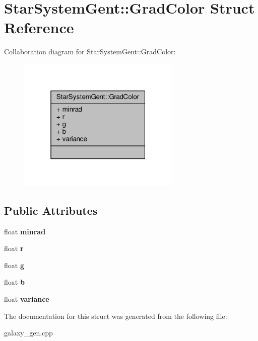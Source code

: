 \hypertarget{structStarSystemGent_1_1GradColor}{}\section{Star\+System\+Gent\+:\+:Grad\+Color Struct Reference}
\label{structStarSystemGent_1_1GradColor}


Collaboration diagram for Star\+System\+Gent\+:\+:Grad\+Color\+:
\nopagebreak
\begin{figure}[H]
\begin{center}
\leavevmode
\includegraphics[width=220pt]{dd/d67/structStarSystemGent_1_1GradColor__coll__graph}
\end{center}
\end{figure}
\subsection*{Public Attributes}
\begin{DoxyCompactItemize}
\item 
float {\bfseries minrad}\hypertarget{structStarSystemGent_1_1GradColor_aa41fe4072a4035c2d85f277485b420f1}{}\label{structStarSystemGent_1_1GradColor_aa41fe4072a4035c2d85f277485b420f1}

\item 
float {\bfseries r}\hypertarget{structStarSystemGent_1_1GradColor_a44e68b0b7adfe5319724967344495e99}{}\label{structStarSystemGent_1_1GradColor_a44e68b0b7adfe5319724967344495e99}

\item 
float {\bfseries g}\hypertarget{structStarSystemGent_1_1GradColor_a58ebc8693698b813aa8406bf289bb51d}{}\label{structStarSystemGent_1_1GradColor_a58ebc8693698b813aa8406bf289bb51d}

\item 
float {\bfseries b}\hypertarget{structStarSystemGent_1_1GradColor_a2a003ead6df6908b931c3c5e15455cd8}{}\label{structStarSystemGent_1_1GradColor_a2a003ead6df6908b931c3c5e15455cd8}

\item 
float {\bfseries variance}\hypertarget{structStarSystemGent_1_1GradColor_afbf3215482c12eea5b7b6b54b335d6fd}{}\label{structStarSystemGent_1_1GradColor_afbf3215482c12eea5b7b6b54b335d6fd}

\end{DoxyCompactItemize}


The documentation for this struct was generated from the following file\+:\begin{DoxyCompactItemize}
\item 
galaxy\+\_\+gen.\+cpp\end{DoxyCompactItemize}
